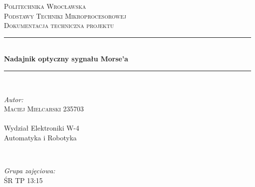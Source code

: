 \documentclass{article}
\begin{document}
\begin{titlepage} %
	\newcommand{\HRule}{\rule{\linewidth}{0.5mm}} %
	
	\center %
	
	
	\textsc{\LARGE Politechnika Wrocławska}\\[1.5cm] %
	
	\textsc{\Large Podstawy Techniki Mikroprocesorowej}\\[0.5cm] %
	
	\textsc{\large Dokumentacja techniczna projektu}\\[0.5cm] %
	
	
	\HRule\\[0.4cm]
	
	{\huge\bfseries Nadajnik optyczny sygnału Morse'a}\\[0.4cm] %
	
	\HRule\\[1.5cm]
	
	
	\begin{minipage}{0.5\textwidth}
		\begin{flushleft}
			\large
			\textit{Autor:}\\
			\textsc{Maciej Mielcarski 235703}\\~\\Wydział Elektroniki W-4\\Automatyka i Robotyka %
		\end{flushleft}
	\end{minipage}
	~
	\begin{minipage}{0.4\textwidth}
		\begin{flushright}
			\large
			\textit{Grupa zajęciowa:}\\
			\textsc{ŚR TP 13:15} %
		\end{flushright}
	\end{minipage}
	


\end{titlepage}
\end{document}
